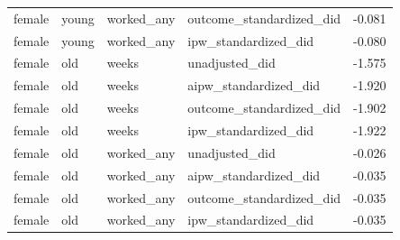 \begin{table}
\begin{tabular}[t]{llllr}
female & young & worked\_any & outcome\_standardized\_did & -0.081\\
female & young & worked\_any & ipw\_standardized\_did & -0.080\\
female & old & weeks & unadjusted\_did & -1.575\\
\addlinespace
female & old & weeks & aipw\_standardized\_did & -1.920\\
female & old & weeks & outcome\_standardized\_did & -1.902\\
female & old & weeks & ipw\_standardized\_did & -1.922\\
female & old & worked\_any & unadjusted\_did & -0.026\\
female & old & worked\_any & aipw\_standardized\_did & -0.035\\
\addlinespace
female & old & worked\_any & outcome\_standardized\_did & -0.035\\
female & old & worked\_any & ipw\_standardized\_did & -0.035\\
\bottomrule
\end{tabular}
\end{table}
